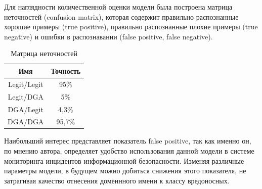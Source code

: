     Для наглядности количественной оценки модели была построена матрица неточностей (confusion matrix), которая содержит правильно распознанные хорошие примеры (true positive), правильно распознанные плохие примеры (true negative) и ошибки в распознавании (false positive, false negative).
    \begin{table}[ht]
    \centering
    \caption{Матрица неточностей}\label{}
    \begin{tabular}{@{}cc@{}}
    \toprule
    Имя         & Точность \\ \midrule
    Legit/Legit & 95\%     \\
    Legit/DGA   & 5\%      \\
    DGA/Legit   & 4,3\%    \\
    DGA/DGA     & 95,7\%   \\ \bottomrule
    \end{tabular}
    \end{table}

    Наибольший интерес представляет показатель false positive, так как именно он, по мнению автора, определяет удобство использования данной модели в системе мониторинга инцидентов информационной безопасности. Изменяя различные параметры модели, в будущем можно добиться снижения этого показателя, не затрагивая качество отнесения доменнного имени к классу вредоносных.
